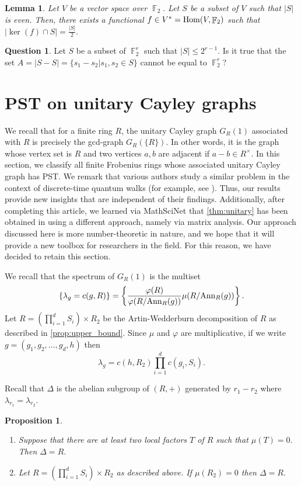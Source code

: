 \documentclass[12pt, a4paper]{amsart}
\newtheorem{prop}[thm]{Proposition}
\newtheorem{lem}[thm]{Lemma}
\theoremstyle{definition}
\newtheorem{question}[thm]{Question}
\DeclareMathOperator{\F}{\mathbb{F}}
\DeclareMathOperator{\Hom}{{\rm Hom}}
\newcommand{\Ann}{{\rm Ann}}
\numberwithin{equation}{section}
\begin{document}
%
\begin{lem}
    Let $V$ be a vector space over $\F_2.$ Let $S$ be a subset of $V$ such that $|S|$ is even. Then, there exists a functional $f \in V^{*}= \Hom(V, \F_2)$ such that $|\ker(f) \cap S| = \frac{|S|}{2}.$
\end{lem}

 

\begin{question}
Let $S$ be a subset of $\F_2^{r}$ such that $|S| \leq 2^{r-1}.$ Is it true that the set $A=|S-S| = \{s_1-s_2| s_1, s_2 \in S \}$ cannot be equal to $\F_2^r$? 
\end{question}
\fi 
\section{\textbf{PST on unitary Cayley graphs}} \label{sec:unitary}
We recall that for a finite ring $R$, the unitary Cayley graph $G_{R}(1)$ associated with $R$ is precisely the gcd-graph $G_{R}(\{R\}).$ In other words, it is the graph whose vertex set is $R$ and two vertices $a,b$ are adjacent if $a-b \in R^{\times}.$ In this section, we classify all finite Frobenius rings whose associated unitary Cayley graph has PST. We remark that various authors study a similar problem in the context of discrete-time quantum walks (for example, see \cite{bhakta2025state}). Thus, our results provide new insights that are independent of their findings. Additionally, after completing this article, we learned via MathSciNet that \cref{thm:unitary} has been obtained in \cite[Theorem 2.5]{pst-gcd-new} using a different approach, namely via matrix analysis. Our approach discussed here is more number-theoretic in nature, and we hope that it will provide a new toolbox for researchers in the field. For this reason, we have decided to retain this section.




We recall that the spectrum of $G_{R}(1)$ is the multiset
\[ \left\{ \lambda_g = c(g, R) \right \} = \left\{ \frac{\varphi(R)}{\varphi(R/\Ann_{R}(g))} \mu(R/\Ann_{R}(g)) \right \}.\]
Let $R=(\prod_{i=1}^d S_i) \times R_2$ be the Artin-Wedderburn decomposition of $R$ as described in \cref{prop:upper_bound}. Since $\mu$ and $\varphi$ are multiplicative, if we write $g=(g_1, g_2, \ldots, g_d, h)$ then 
\[ \lambda_{g} = c(h, R_2) \prod_{i=1}^d c(g_i, S_i). \]

Recall that $\Delta$  is the abelian subgroup of $(R,+)$ generated by $r_1-r_2$ where $\lambda_{r_1}=\lambda_{r_2}$. 
\begin{prop}
\noindent
\begin{enumerate}
    \item  Suppose that there are at least two local factors $T$ of $R$ such that $\mu(T)=0.$ Then $\Delta = R.$
    \item Let $R=(\prod_{i=1}^d S_i) \times R_2$ as described above. If $\mu(R_2) = 0$ then $\Delta= R.$
\end{enumerate}
\end{prop}
\end{document}
